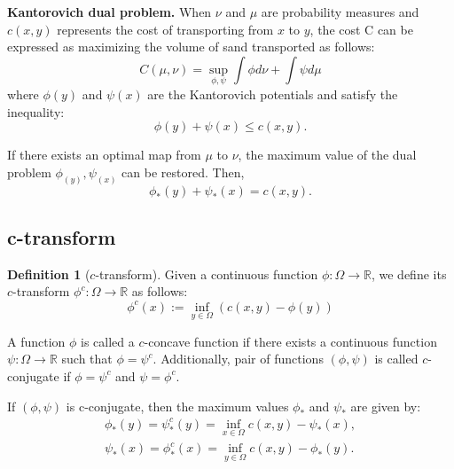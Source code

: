 \documentclass[a4j,10pt, twocolumn, dvipdfmx]{article}
\theoremstyle{definition}
\newtheorem{dfn}{Definition}[section]
\begin{document}
\textbf{Kantorovich dual problem.}
When $\nu$ and $\mu$ are probability measures and $c(x, y)$ represents the cost of transporting from $x$ to $y$, the cost C can be expressed as maximizing the volume of sand transported as follows:
\begin{equation*}
    C(\mu, \nu) = \sup_{\phi, \psi} \int \phi d\nu + \int \psi d\mu
\end{equation*}
where $\phi(y)$ and $\psi(x)$ are the Kantorovich potentials and satisfy the inequality:
\begin{equation*}
    \phi(y) + \psi(x) \le c(x, y).
\end{equation*}

If there exists an optimal map from $\mu$ to $\nu$, the maximum value of the dual problem $\phi_(y), \psi_(x)$ can be restored. Then,
\begin{equation*}
    \phi_*(y) + \psi_*(x) = c(x, y).
\end{equation*}

\subsection{c-transform}

\begin{dfn}[$c$-transform]
    Given a continuous function $\phi: \Omega \to \mathbb{R}$, 
    we define its $c$-transform $\phi^c: \Omega \to \mathbb{R}$ as follows:
    \begin{equation*}
        \phi^c(x) := \inf_{y \in \Omega} (c(x, y) - \phi(y))
    \end{equation*}
    
    A function $\phi$ is called a $c$-concave function if there exists a continuous function $\psi: \Omega \to \mathbb{R}$ such that $\phi = \psi^c$.
    Additionally,  pair of functions $(\phi, \psi)$ is called $c$-conjugate if $\phi = \psi^c$ and $\psi = \phi^c$.
\end{dfn}

If $(\phi, \psi)$ is c-conjugate, then the maximum values $\phi_*$ and $\psi_*$ are given by:
\begin{align*}
    \phi_*(y) = \psi^c_*(y) = \inf_{x \in \Omega}{c(x, y) - \psi_*(x) },\\
    \psi_*(x) = \phi^c_*(x) = \inf_{y \in \Omega}{c(x, y) - \phi_*(y) }.
\end{align*}
\end{document}
